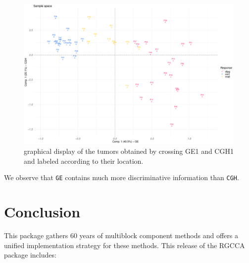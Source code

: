 \documentclass[
]{jss}
\begin{document}
\footnotesize

\begin{CodeChunk}
\begin{figure}

{\centering \includegraphics{RGCCA_files/figure-latex/unnamed-chunk-51-1} 

}

\caption[graphical display of the tumors obtained by crossing GE1 and CGH1 and labeled according to their location]{graphical display of the tumors obtained by crossing GE1 and CGH1 and labeled according to their location.}\label{fig:unnamed-chunk-51}
\end{figure}
\end{CodeChunk}

\normalsize

We observe that \texttt{GE} contains much more discriminative
information than \texttt{CGH}. \newpage

\hypertarget{conclusion}{%
\section{Conclusion}\label{conclusion}}

This package gathers 60 years of multiblock component methods and offers
a unified implementation strategy for these methods. This release of the
RGCCA package includes:
\end{document}
